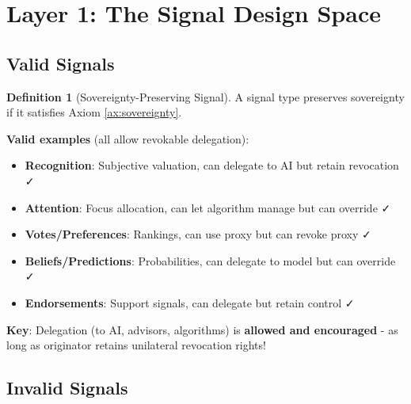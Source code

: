 \documentclass[11pt,a4paper]{article}
\theoremstyle{definition}
\newtheorem{definition}[theorem]{Definition}
\theoremstyle{remark}
\begin{document}
\section{Layer 1: The Signal Design Space}

\subsection{Valid Signals}

\begin{definition}[Sovereignty-Preserving Signal]
A signal type preserves sovereignty if it satisfies Axiom \ref{ax:sovereignty}.

\textbf{Valid examples} (all allow revokable delegation):
\begin{itemize}
\item \textbf{Recognition}: Subjective valuation, can delegate to AI but retain revocation ✓
\item \textbf{Attention}: Focus allocation, can let algorithm manage but can override ✓
\item \textbf{Votes/Preferences}: Rankings, can use proxy but can revoke proxy ✓
\item \textbf{Beliefs/Predictions}: Probabilities, can delegate to model but can override ✓
\item \textbf{Endorsements}: Support signals, can delegate but retain control ✓
\end{itemize}

\textbf{Key}: Delegation (to AI, advisors, algorithms) is \textbf{allowed and encouraged} - as long as originator retains unilateral revocation rights!
\end{definition}

\subsection{Invalid Signals}
\end{document}
